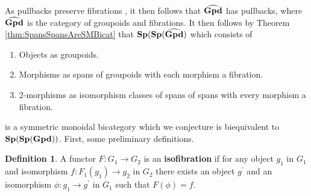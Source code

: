 \documentclass[11pt]{amsart}
\theoremstyle{remark}
\theoremstyle{definition}
\newtheorem{defn}[thm]{Definition}
\begin{document}
As pullbacks preserve fibrations \cite{Brown,Heath}, it then follows that $\bold{\widehat{Gpd}}$ has pullbacks, where $\bold{\widehat{Gpd}}$ is the category of groupoids and fibrations. It then follows by Theorem \ref{thm:SpansSpansAreSMBicat} that $\bold{Sp(Sp(\widehat{Gpd})}$ which consists of
\begin{enumerate}
\item{Objects as groupoids.}
\item{Morphisms as spans of groupoids with each morphism a fibration.}
\item{2-morphisms as isomorphism classes of spans of spans with every morphism a fibration.}
\end{enumerate}
is a symmetric monoidal bicategory which we conjecture is biequivalent to $\bold{Sp(Sp(Gpd))}$.
First, some preliminary definitions.
\begin{defn}
A functor $F \colon G_{1} \to G_{2}$ is an \textbf{isofibration} if for any object $g_{1}$ in $G_{1}$ and isomorphism $f \colon F_{1}(g_{1}) \to g_{2}$ in $G_{2}$ there exists an object $g^\prime$ and an isomorphism $\phi \colon g_{1} \to g^\prime$ in $G_{1}$ such that $F(\phi)=f$.
\end{defn}
\end{document}
